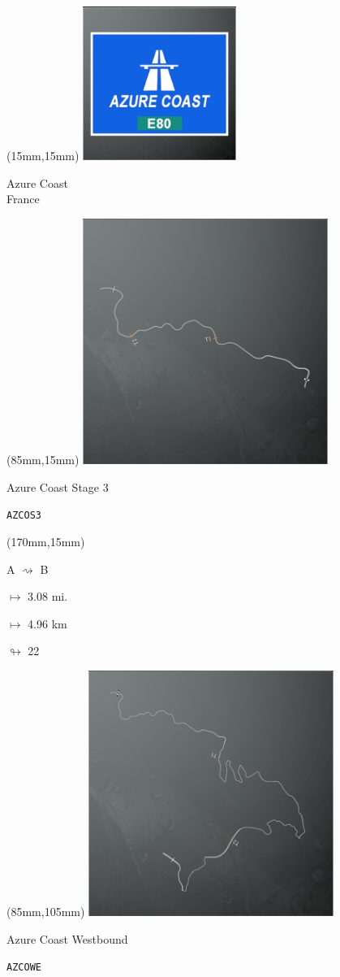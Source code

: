\begin{textblock*}{60mm}(15mm,15mm)%
\includegraphics[width=50mm]{LG/2015-05-20_00073.png}
\par Azure Coast\\ France
\end{textblock*}
\begin{textblock*}{80mm}(85mm,15mm)%
\includegraphics[width=80mm]{TR/2015-05-20_00005.png}
\centerline{Azure Coast Stage 3}
\par\hfill\tiny\tt AZCOS3\\
\end{textblock*}
\begin{textblock*}{30mm}(170mm,15mm)%
\par A $\rightsquigarrow$ B
\Large
\par$\mapsto$ 3.08 mi.
\par$\mapsto$ 4.96 km
\par$\looparrowright$ 22
\end{textblock*}
\begin{textblock*}{80mm}(85mm,105mm)%
\includegraphics[width=80mm]{TR/2015-05-20_00006.png}
\centerline{Azure Coast Westbound}
\par\hfill\tiny\tt AZCOWE\\
\end{textblock*}
